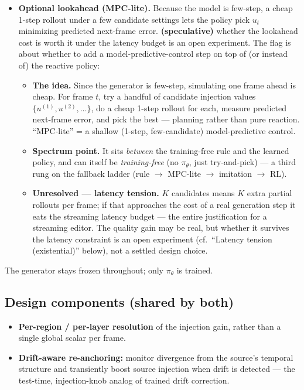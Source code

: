 \documentclass{article}
\begin{document}
\begin{itemize}
        Default: sparse terminal reward (intellectually honest, matches GINH's setup), while
        acknowledging the long-horizon credit-assignment risk is real and may force some shaping.
  \item \textbf{Optional lookahead (MPC-lite).} Because the model is few-step, a cheap 1-step
        rollout under a few candidate settings lets the policy pick $u_t$ minimizing predicted
        next-frame error. \textbf{(speculative)} whether the lookahead cost is worth it under
        the latency budget is an open experiment. The flag is about whether to add a
        model-predictive-control step on top of (or instead of) the reactive policy:
        \begin{itemize}
          \item \textbf{The idea.} Since the generator is few-step, simulating one frame ahead
                is cheap. For frame $t$, try a handful of candidate injection values
                $\{u^{(1)}, u^{(2)}, \dots\}$, do a cheap 1-step rollout for each, measure
                predicted next-frame error, and pick the best --- planning rather than pure
                reaction. ``MPC-lite'' = a shallow (1-step, few-candidate) model-predictive
                control.
          \item \textbf{Spectrum point.} It sits \emph{between} the training-free rule and the
                learned policy, and can itself be \emph{training-free} (no $\pi_\theta$, just
                try-and-pick) --- a third rung on the fallback ladder (rule $\to$ MPC-lite $\to$
                imitation $\to$ RL).
          \item \textbf{Unresolved --- latency tension.} $K$ candidates means $K$ extra partial
                rollouts per frame; if that approaches the cost of a real generation step it
                eats the streaming latency budget --- the entire justification for a streaming
                editor. The quality gain may be real, but whether it survives the latency
                constraint is an open experiment (cf.\ ``Latency tension (existential)'' below),
                not a settled design choice.
        \end{itemize}
\end{itemize}
The generator stays frozen throughout; only $\pi_\theta$ is trained.

\subsection*{Design components (shared by both)}
\begin{itemize}
  \item \textbf{Per-region / per-layer resolution} of the injection gain, rather than a single
        global scalar per frame.
  \item \textbf{Drift-aware re-anchoring:} monitor divergence from the source's temporal
        structure and transiently boost source injection when drift is detected --- the
        test-time, injection-knob analog of trained drift correction.
\end{itemize}
\end{document}
